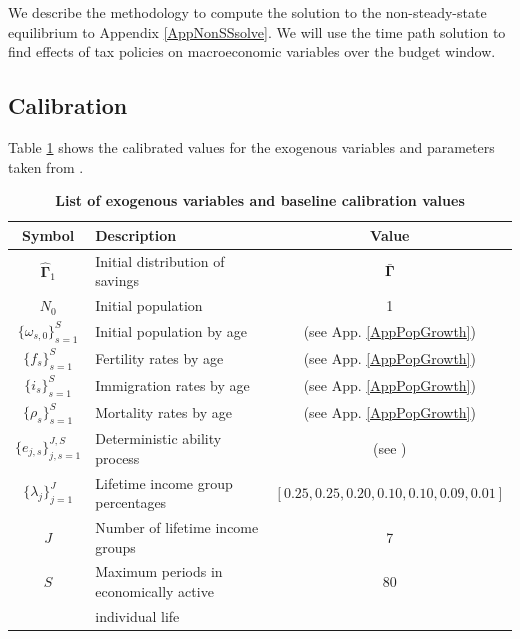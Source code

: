 \documentclass[letterpaper,12pt]{article}
\theoremstyle{definition}
\begin{document}
\begin{spacing}{1.5}
    \vspace{10mm}

    We describe the methodology to compute the solution to the non-steady-state equilibrium to Appendix \ref{AppNonSSsolve}.  We will use the time path solution to find effects of tax policies on macroeconomic variables over the budget window.


  \subsection{Calibration}\label{SecCalib}

    Table \ref{TabExogVars} shows the calibrated values for the exogenous variables and parameters taken from \citet{DEMPRW2015}.

    \begin{table}[htbp] \centering \captionsetup{width=4.7in}
    \caption{\label{TabExogVars}\textbf{List of exogenous variables and baseline calibration values}}
      \begin{threeparttable}
      \begin{tabular}{>{\footnotesize}c |>{\footnotesize}l |>{\footnotesize}c}
        \hline\hline
        Symbol & \quad\quad\quad\quad Description & Value \\
        \hline
        $\bm{\hat{\Gamma}}_1$ & Initial distribution of savings & $\bm{\bar{\Gamma}}$ \\
        $N_0$ & Initial population & 1 \\
        $\{\omega_{s,0}\}_{s=1}^S$ & Initial population by age & (see App. \ref{AppPopGrowth}) \\
        $\{f_s\}_{s=1}^S$ & Fertility rates by age & (see App. \ref{AppPopGrowth}) \\
        $\{i_s\}_{s=1}^S$ & Immigration rates by age & (see App. \ref{AppPopGrowth}) \\
        $\{\rho_s\}_{s=1}^S$ & Mortality rates by age & (see App. \ref{AppPopGrowth}) \\
        $\{e_{j,s}\}_{j,s=1}^{J,S}$ & Deterministic ability process & (see \citealp{DEMPRW2015}) \\
        $\{\lambda_j\}_{j=1}^J$ & Lifetime income group percentages & $[0.25,0.25,0.20,0.10,0.10,0.09,0.01]$ \\
        $J$ & Number of lifetime income groups & 7 \\
        $S$ & Maximum periods in economically active & 80 \\[-2mm]
        &\quad individual life & \\

\end{tabular}
\end{threeparttable}
\end{table}
\end{spacing}
\end{document}
